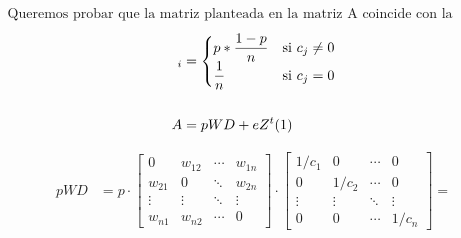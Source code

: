 \documentclass{article}
\begin{document}
	
	\begin{align*}
		\text{Queremos probar que la matriz planteada en la matriz A coincide con la ecuación (1)} 
	\end{align*}
    \begin{align*}
		[a]_{i} &= \begin{cases}
			p*\dfrac{1-p}{n} & \text{si } c_{j} \neq 0 \\
			\dfrac{1}{n} & \text{si } c_{j} = 0
		\end{cases} \notag \\
	     \\
		A &= pWD + eZ^t  \text{(1)}
	\end{align*}
	
	\begin{align*}
		pWD &= p \cdot \begin{bmatrix}
			0 & w_{12} & \cdots & w_{1n} \\
			w_{21}& 0 & \ddots &  w_{2n} \\
			\vdots & \vdots &\ddots &\vdots \\
			w_{n1} & w_{n2} & \cdots & 0
		\end{bmatrix} \cdot \begin{bmatrix}
			1/c_{1}& 0 & \cdots & 0 \\
			0& 1/c_{2} & \cdots &  0\\
			\vdots & \vdots &\ddots &\vdots \\
			0 & 0 &\cdots & 1/c_{n}
		\end{bmatrix} =\\
	\end{align*}
	
\end{document}

